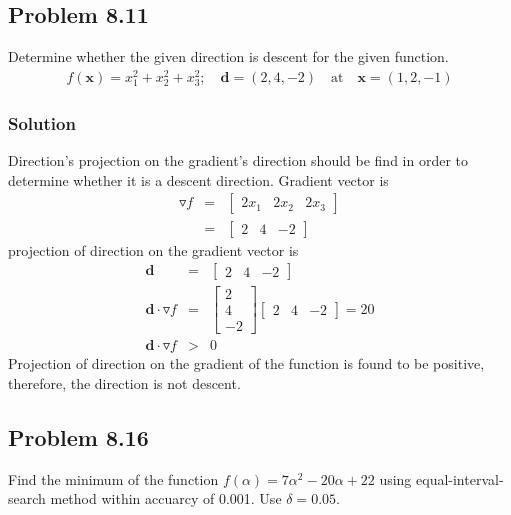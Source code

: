 \documentclass[]{report}
\begin{document}
\subsection*{Problem 8.11}
Determine whether the given direction is descent for the given function.
\begin{eqnarray*}
f\left(\mathbf x\right)=x_1^2+x_2^2+x_3^2 ; \quad \mathbf d=\left(2,4,-2\right)\quad \mathrm{at} \quad \mathbf{x}=\left(1,2,-1\right)
\end{eqnarray*}
\subsubsection*{Solution}
Direction's projection on the gradient's direction should be find in order to determine whether it is a descent direction. Gradient vector is
\begin{eqnarray*}
\mathbf \triangledown f&=&\left[\begin{array}{ccc}
2x_1& 2x_2& 2x_3
\end{array}\right]
\\
&=&\left[\begin{array}{ccc}
2 &4& -2
\end{array}\right]
\end{eqnarray*}
projection of direction on the gradient vector is
\begin{eqnarray*}
\mathbf d&=&\left[\begin{array}{ccc}
2 &4& -2
\end{array}\right]
\\
\mathbf d \cdot  \mathbf \triangledown f &=&\left[\begin{array}{c}
2 \\4\\ -2
\end{array}\right]\left[\begin{array}{ccc}
2 &4& -2
\end{array}\right]=20\\
\mathbf d \cdot  \mathbf \triangledown f &>& 0 
\end{eqnarray*}
Projection of direction on the gradient of the function is found to be positive, therefore, the direction is not descent. 
\subsection*{Problem 8.16}
Find the minimum of the function $f\left(\alpha\right)=7\alpha^2-20\alpha+22$ using equal-interval-search method within accuarcy of 0.001. Use $\delta=0.05$.
\end{document}
